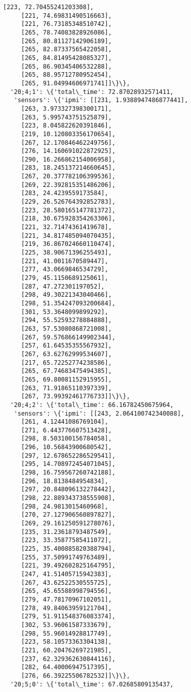\documentclass[11pt]{article}
\begin{document}
\begin{tcolorbox}[breakable, size=fbox, boxrule=.5pt, pad at break*=1mm, opacityfill=0]
\begin{Verbatim}[commandchars=\\\{\}]
     [223, 72.70455241203308],
     [221, 74.69831490516663],
     [221, 76.73185348510742],
     [265, 78.74083828926086],
     [265, 80.81127142906189],
     [265, 82.87337565422058],
     [265, 84.81495428085327],
     [265, 86.90345406532288],
     [265, 88.95712780952454],
     [265, 91.04994606971741]]\}\},
  '20;4;1': \{'total\_time': 72.87028932571411,
   'sensors': \{'ipmi': [[231, 1.9388947486877441],
     [263, 3.973327398300171],
     [263, 5.995743751525879],
     [223, 8.045822620391846],
     [219, 10.120803356170654],
     [267, 12.170846462249756],
     [276, 14.160691022872925],
     [290, 16.266862154006958],
     [283, 18.245137214660645],
     [267, 20.377782106399536],
     [269, 22.392815351486206],
     [283, 24.4239559173584],
     [229, 26.526764392852783],
     [223, 28.580165147781372],
     [218, 30.675928354263306],
     [221, 32.71474361419678],
     [221, 34.817485094070435],
     [219, 36.867024660110474],
     [225, 38.90671396255493],
     [221, 41.0011670589447],
     [277, 43.0669846534729],
     [279, 45.1150689125061],
     [287, 47.272301197052],
     [298, 49.30221343040466],
     [298, 51.354247093200684],
     [301, 53.3648099899292],
     [294, 55.52593278884888],
     [263, 57.53080868721008],
     [267, 59.576866149902344],
     [257, 61.64535355567932],
     [267, 63.62762999534607],
     [217, 65.72252774238586],
     [265, 67.74683475494385],
     [265, 69.80081152915955],
     [263, 71.91865110397339],
     [267, 73.99392461776733]]\}\},
  '20;4;2': \{'total\_time': 66.16782450675964,
   'sensors': \{'ipmi': [[243, 2.064100742340088],
     [261, 4.12441086769104],
     [271, 6.443776607513428],
     [298, 8.503100156784058],
     [296, 10.56843900680542],
     [297, 12.678652286529541],
     [295, 14.708972454071045],
     [298, 16.759567260742188],
     [296, 18.8138484954834],
     [297, 20.848096132278442],
     [298, 22.889343738555908],
     [298, 24.9813015460968],
     [270, 27.127906560897827],
     [269, 29.161250591278076],
     [235, 31.23618793487549],
     [223, 33.35877585411072],
     [225, 35.400885820388794],
     [255, 37.50991749763489],
     [221, 39.492602825164795],
     [247, 41.51405715942383],
     [267, 43.62522530555725],
     [265, 45.65588998794556],
     [279, 47.78170967102051],
     [278, 49.84063959121704],
     [279, 51.911548376083374],
     [302, 53.96061587333679],
     [298, 55.96014928817749],
     [223, 58.10573363304138],
     [221, 60.20476269721985],
     [237, 62.329362630844116],
     [282, 64.40006947517395],
     [276, 66.39225506782532]]\}\},
  '20;5;0': \{'total\_time': 67.02685809135437,

\end{Verbatim}
\end{tcolorbox}
\end{document}
